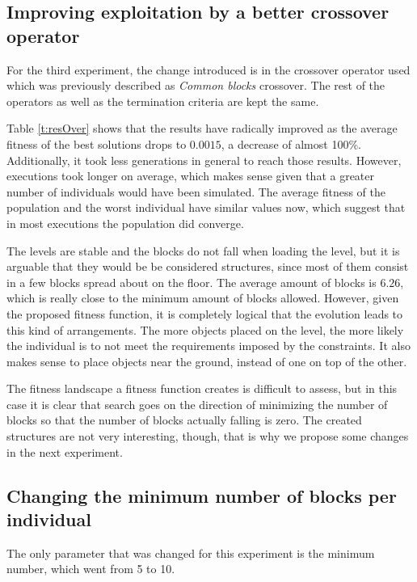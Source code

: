 \documentclass[runningheads,a4paper]{llncs}
\begin{document}
\subsection{Improving exploitation by a better crossover operator}


For the third experiment, the change introduced is in the crossover operator 
used which was previously described as \textit{Common blocks} crossover. 
The rest of the operators as 
well as the termination criteria are kept the same. 


Table \ref{t:resOver} shows that the results have radically improved as the 
average fitness of the best solutions drops to $0.0015$, a decrease of almost 
100\%. Additionally, it took less generations in general to reach those 
results. However, executions took longer on average, which makes sense given 
that a greater number of individuals would have been simulated. The average 
fitness of the population and the worst individual have similar values now, 
which suggest that in most executions the population did converge.

The levels are stable and the blocks do not fall when loading the level, but 
it is arguable that they would be be considered structures, since most of them consist in a 
few blocks spread about on the floor. The average amount of blocks is $6.26$, 
which is really close to the minimum amount of blocks allowed. However, given 
the proposed fitness function, it is completely logical that the evolution 
leads to this kind of arrangements. The more objects placed on the level, the 
more likely the individual is to not meet the requirements imposed by the 
constraints. It also makes sense to place objects near the ground, instead of 
one on top of the other.

The fitness landscape a fitness function creates is difficult to
assess, but in this case it is clear that search goes on the direction
of minimizing the number of blocks so that the number of blocks
actually falling is zero. The created structures are not very
interesting, though, that is why we propose some changes in the next experiment.

\subsection{Changing the minimum number of blocks per individual}

The only parameter that was changed for this experiment is the minimum
number, which went from 5 to 10. 
\end{document}
